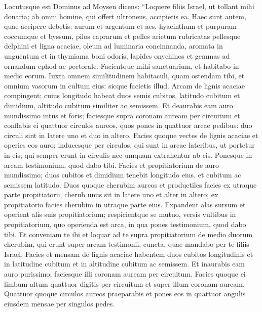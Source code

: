 \begin{biblechapter}  
\verse Locutusque est Dominus ad Moysen dicens: 
\verse “Loquere filiis Israel, ut tollant mihi donaria; ab omni homine, qui offert ultroneus, accipietis ea.  
\verse Haec sunt autem, quae accipere debetis: aurum et argentum et aes, 
\verse hyacinthum et purpuram coccumque et byssum, pilos caprarum 
\verse et pelles arietum rubricatas pellesque delphini et ligna acaciae, 
\verse oleum ad luminaria concinnanda, aromata in unguentum et in thymiama boni odoris, 
\verse lapides onychinos et gemmas ad ornandum ephod ac pectorale. 
\verse Facientque mihi sanctuarium, et habitabo in medio eorum. 
\verse Iuxta omnem similitudinem habitaculi, quam ostendam tibi, et omnium vasorum in cultum eius: sicque facietis illud. 
\verse Arcam de lignis acaciae compingent; cuius longitudo habeat duos semis cubitos, latitudo cubitum et dimidium, altitudo cubitum similiter ac semissem. 
\verse Et deaurabis eam auro mundissimo intus et foris; faciesque supra coronam auream per circuitum 
\verse et conflabis ei quattuor circulos aureos, quos pones in quattuor arcae pedibus: duo circuli sint in latere uno et duo in altero.  
\verse Facies quoque vectes de lignis acaciae et operies eos auro; 
\verse inducesque per circulos, qui sunt in arcae lateribus, ut portetur in eis; 
\verse qui semper erunt in circulis nec umquam extrahentur ab eis. 
\verse Ponesque in arcam testimonium, quod dabo tibi. 
\verse Facies et propitiatorium de auro mundissimo; duos cubitos et dimidium tenebit longitudo eius, et cubitum ac semissem latitudo. 
\verse Duos quoque cherubim aureos et productiles facies ex utraque parte propitiatorii, 
\verse cherub unus sit in latere uno et alter in altero; ex propitiatorio facies cherubim in utraque parte eius. 
\verse Expandent alas sursum et operient alis suis propitiatorium; respicientque se mutuo, versis vultibus in propitiatorium,  
\verse quo operienda est arca, in qua pones testimonium, quod dabo tibi. 
\verse Et conveniam te ibi et loquar ad te supra propitiatorium de medio duorum cherubim, qui erunt super arcam testimonii, cuncta, quae mandabo per te filiis Israel. 
\verse Facies et mensam de lignis acaciae habentem duos cubitos longitudinis et in latitudine cubitum et in altitudine cubitum ac semissem. 
\verse Et inaurabis eam auro purissimo; faciesque illi coronam auream per circuitum. 
\verse Facies quoque ei limbum altum quattuor digitis per circuitum et super illum coronam auream. 
\verse Quattuor quoque circulos aureos praeparabis et pones eos in quattuor angulis eiusdem mensae per singulos pedes. 

\end{biblechapter}
